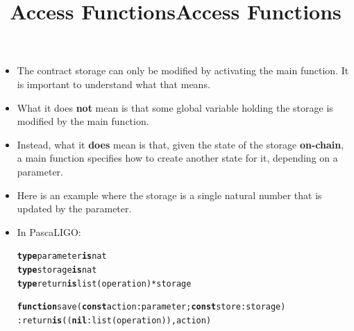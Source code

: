 \documentclass[wide]{slides}
\newcommand{\Kconst}[0]{\textbf{const}\xspace}
\newcommand{\Kfunction}[0]{\textbf{function}\xspace}
\newcommand{\Kis}[0]{\textbf{is}\xspace}
\newcommand{\Knil}[0]{\textbf{nil}\xspace}
\newcommand{\Ktype}[0]{\textbf{type}\xspace}
\begin{document}
\begin{slide}
  \title{Access Functions}

  \begin{itemize}

    \item The contract storage can only be modified by activating the
      main function. It is important to understand what that
      means.

    \item What it does \textbf{not} mean is that some global variable
      holding the storage is modified by the main function.

    \item Instead, what it \textbf{does} mean is that, given the state
      of the storage \textbf{on-chain}, a main function specifies how
      to create another state for it, depending on a parameter.

  \end{itemize}

\end{slide}

\begin{slide}
  \title{Access Functions}

  \begin{itemize}

    \item Here is an example where the storage is a single natural
      number that is updated by the parameter.

    \item In PascaLIGO:
      \begin{alltt}
\Ktype parameter \Kis nat
\Ktype storage \Kis nat
\Ktype return \Kis list (operation) * storage

\Kfunction save (\Kconst action : parameter; \Kconst store : storage)
  : return \Kis ((\Knil : list (operation)), action)
      \end{alltt}

  \end{itemize}

\end{slide}
\end{document}

